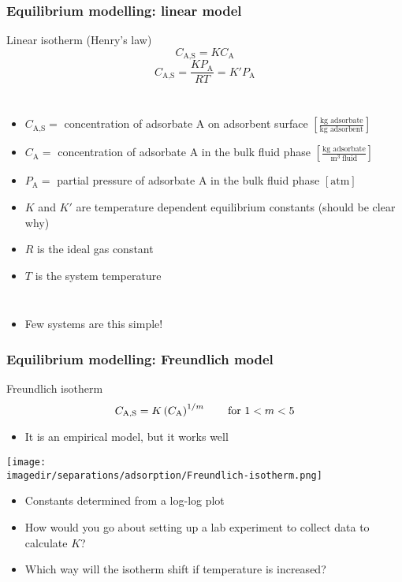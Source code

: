 \begin{frame}\frametitle{Equilibrium modelling: linear model}
	\begin{exampleblock}{Linear isotherm (Henry's law)}
		\[C_\text{A,S} = K C_\text{A}\]
		\[C_\text{A,S} = \frac{K P_\text{A}}{RT} = K' P_\text{A}\]
	\end{exampleblock}
	\begin{columns}[t]
			\begin{itemize}
				\item	{\small $C_\text{A,S} =$ concentration of adsorbate A on adsorbent surface \hfill $\left[\displaystyle \frac{\text{kg adsorbate}}{\text{kg adsorbent}}\right]$}
				\item	{\small $C_\text{A} =$ concentration of adsorbate A in the bulk fluid phase \hfill $\left[\displaystyle \frac{\text{kg adsorbate}}{\text{m}^3~ \text{fluid}}\right]$}
				\item	{\small $P_\text{A} =$ partial pressure of adsorbate A in the bulk fluid phase \hfill $\left[ \text{atm}\right]\,$}
				\item	{\small $K$ and $K'$ are temperature dependent equilibrium constants {\tiny (should be clear why)}}
				\item	{\small $R$ is the ideal gas constant}
				\item	{\small $T$ is the system temperature}
			\end{itemize}
	\end{columns}
	\vspace{12pt}
	\begin{itemize}
		\item	Few systems are this simple!
	\end{itemize}
\end{frame}

\begin{frame}\frametitle{Equilibrium modelling: Freundlich model}
	\begin{exampleblock}{Freundlich isotherm}
		\[C_\text{A,S} = K \left(C_\text{A}\right)^{1/m}\qquad \text{for $ 1 < m < 5$}\] 
	\end{exampleblock}

	\vspace{12pt}
	\begin{itemize}
		\item	It is an empirical model, but it works well
	\end{itemize}
	\begin{center}
		\texttt{[image: \\imagedir/separations/adsorption/Freundlich-isotherm.png]}
	\end{center}
	
	\begin{itemize}
		\item	Constants determined from a log-log plot
		\item	How would you go about setting up a lab experiment to collect data to calculate $K$?
		\item	Which way will the isotherm shift if temperature is increased?
	\end{itemize}
\end{frame}


